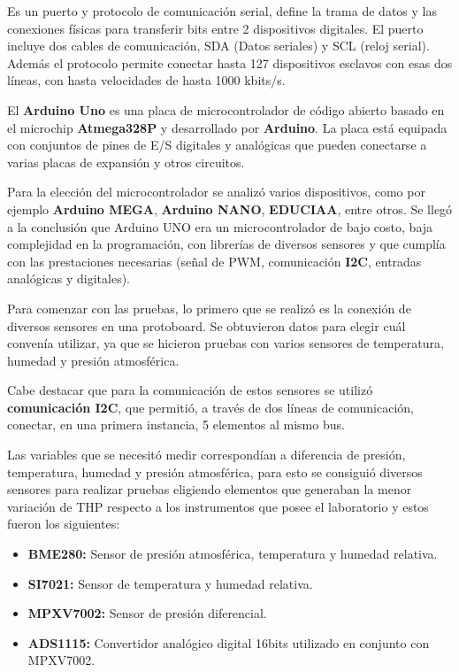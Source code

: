 \begin{tcolorbox}[colback=blue!5!white,colframe=blue!75!black,title=I2C]
	Es un puerto y protocolo de comunicación serial, define la trama de datos y las conexiones físicas para transferir bits entre 2 dispositivos digitales. El puerto incluye dos cables de comunicación, SDA (Datos seriales) y SCL (reloj serial). Además el protocolo permite conectar hasta 127 dispositivos esclavos con esas dos líneas, con hasta velocidades de hasta 1000 kbits/s. \end{tcolorbox}

\begin{tcolorbox}[colback=blue!5!white,colframe=blue!75!black,title=Arduino] El\textbf{ Arduino Uno} es una placa de microcontrolador de código abierto basado en el microchip \textbf{Atmega328P} y desarrollado por \textbf{Arduino}. La placa está equipada con conjuntos de pines de E/S digitales y analógicas que pueden conectarse a varias placas de expansión y otros circuitos.
   \end{tcolorbox}

	

Para la elección del microcontrolador se analizó varios dispositivos, como por ejemplo \textbf{Arduino MEGA}, \textbf{Arduino NANO}, \textbf{EDUCIAA}, entre otros. Se llegó a la conclusión que Arduino UNO era un microcontrolador de bajo costo, baja complejidad en la programación, con librerías de diversos sensores y que cumplía con las prestaciones necesarias (señal de PWM, comunicación \textbf{I2C}, entradas analógicas y digitales).


Para comenzar con las pruebas, lo primero que se realizó es la conexión de diversos sensores en una protoboard. Se obtuvieron datos para elegir cuál  convenía utilizar, ya que se hicieron pruebas con varios sensores de temperatura, humedad y presión atmosférica.


Cabe destacar que para la comunicación de estos sensores se utilizó \textbf{comunicación I2C}, que permitió, a través de dos líneas de comunicación, conectar, en una primera instancia,  5 elementos al mismo bus.

Las variables que se necesitó medir correspondían a diferencia de presión, temperatura, humedad y presión atmosférica, para esto se consiguió diversos sensores para realizar pruebas eligiendo elementos que generaban la menor variación de THP respecto a los instrumentos que posee el laboratorio y estos fueron los siguientes:

\begin{itemize}
	\item  \textbf{BME280:} Sensor de presión atmosférica, temperatura y humedad relativa.
	\item \textbf{SI7021:} Sensor de temperatura y humedad relativa.
	\item \textbf{MPXV7002:} Sensor de presión diferencial.
	\item \textbf{ADS1115:} Convertidor analógico digital 16bits utilizado en conjunto con MPXV7002.
\end{itemize}


